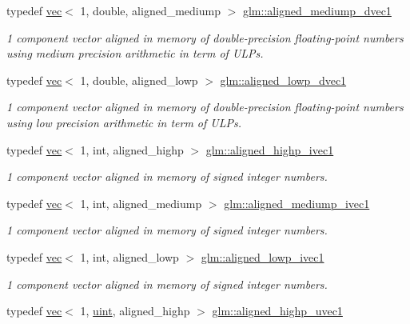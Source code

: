 \begin{DoxyCompactItemize}
typedef \hyperlink{structglm_1_1vec}{vec}$<$ 1, double, aligned\+\_\+mediump $>$ \hyperlink{group__gtc__type__aligned_gad123cfb2803e67ae9f973bbd57bf86e3}{glm\+::aligned\+\_\+mediump\+\_\+dvec1}
\begin{DoxyCompactList}\small\item\em 1 component vector aligned in memory of double-\/precision floating-\/point numbers using medium precision arithmetic in term of U\+L\+Ps. \end{DoxyCompactList}\item 
typedef \hyperlink{structglm_1_1vec}{vec}$<$ 1, double, aligned\+\_\+lowp $>$ \hyperlink{group__gtc__type__aligned_gaa0811727b30ac5c917d48f43354f2d1f}{glm\+::aligned\+\_\+lowp\+\_\+dvec1}
\begin{DoxyCompactList}\small\item\em 1 component vector aligned in memory of double-\/precision floating-\/point numbers using low precision arithmetic in term of U\+L\+Ps. \end{DoxyCompactList}\item 
typedef \hyperlink{structglm_1_1vec}{vec}$<$ 1, int, aligned\+\_\+highp $>$ \hyperlink{group__gtc__type__aligned_ga90ebad7148156f223d4743091c9870d5}{glm\+::aligned\+\_\+highp\+\_\+ivec1}
\begin{DoxyCompactList}\small\item\em 1 component vector aligned in memory of signed integer numbers. \end{DoxyCompactList}\item 
typedef \hyperlink{structglm_1_1vec}{vec}$<$ 1, int, aligned\+\_\+mediump $>$ \hyperlink{group__gtc__type__aligned_ga03b5b767207f413195dde0290a19dac1}{glm\+::aligned\+\_\+mediump\+\_\+ivec1}
\begin{DoxyCompactList}\small\item\em 1 component vector aligned in memory of signed integer numbers. \end{DoxyCompactList}\item 
typedef \hyperlink{structglm_1_1vec}{vec}$<$ 1, int, aligned\+\_\+lowp $>$ \hyperlink{group__gtc__type__aligned_gadf9e665b78c3aead513e9505fa31f9e2}{glm\+::aligned\+\_\+lowp\+\_\+ivec1}
\begin{DoxyCompactList}\small\item\em 1 component vector aligned in memory of signed integer numbers. \end{DoxyCompactList}\item 
typedef \hyperlink{structglm_1_1vec}{vec}$<$ 1, \hyperlink{group__core__precision_ga4fd29415871152bfb5abd588334147c8}{uint}, aligned\+\_\+highp $>$ \hyperlink{group__gtc__type__aligned_ga3ba8c6f6b81f57159b0536ce5d4339d0}{glm\+::aligned\+\_\+highp\+\_\+uvec1}

\end{DoxyCompactItemize}
